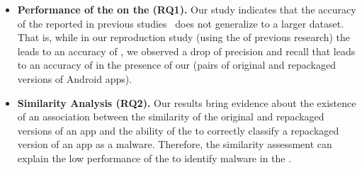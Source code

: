 \begin{itemize}
\item \textbf{Performance of the \mas on the \cds (RQ1).} 
  Our study indicates that the accuracy of the \mas reported in
  previous studies~\cite{DBLP:conf/wcre/BaoLL18,DBLP:journals/jss/CostaMMSSBNR22} does not
  generalize to a larger dataset. That is, while in our
  reproduction study (using the \sds of previous research) the \mas
  leads to an accuracy of \fscoreSmall, we observed a drop of precision and recall
  that leads to an accuracy of \fscore in the presence of our \cds (\apps pairs of
  original and repackaged versions of Android apps). 


\item \textbf{Similarity Analysis (RQ2).} Our results bring evidence about the existence of an association between the similarity of the original and repackaged versions of an app and the ability of the \mas to correctly classify a repackaged version of an app as a malware. Therefore, the similarity assessment can explain the low performance of the \mas to identify malware in the \cds.


\end{itemize}



